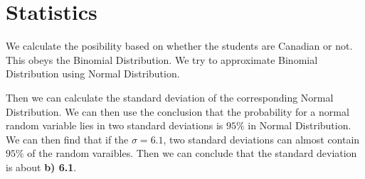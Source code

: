 \documentclass[12pt]{report}
\begin{document}
\section{Statistics}
We calculate the posibility based on whether the students are Canadian or not. This obeys the Binomial Distribution. We try to approximate
Binomial Distribution using Normal Distribution.
\par
Then we can calculate the standard deviation of the corresponding Normal Distribution. We can then use the conclusion that the probability
for a normal random variable lies in two standard deviations is $95\%$ in Normal Distribution. We can then find that if the $\sigma = 6.1$,
two standard deviations can almost contain $95\%$ of the random varaibles. Then we can conclude that the standard deviation is about \textbf{b) 6.1}.
\end{document}
